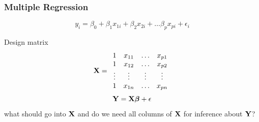 \documentclass[]{beamer}
\begin{document}
\begin{frame}
  \frametitle{Multiple Regression}
  $$y_i = \beta_0 + \beta_1 x_{1i} + \beta_2 x_{2i} + \ldots \beta_{p}
  x_{p i} + \epsilon_i$$

\pause
Design matrix  $$\mathbf{X} =
\begin{array}{cccc}
  1 & x_{11} & \ldots & x_{p1} \\
  1 & x_{12}  & \ldots & x_{p2} \\
  \vdots & \vdots  & \vdots & \vdots \\
  1 & x_{1n} & \ldots & x_{pn} \\
\end{array}
$$
\pause
$$\mathbf{Y} = \mathbf{X} \boldsymbol{\beta} + \epsilon$$
\pause
what should go into $\mathbf{X}$ and do we need all columns of $\mathbf{X}$ for
inference about $\mathbf{Y}$?
\end{frame}
\end{document}
